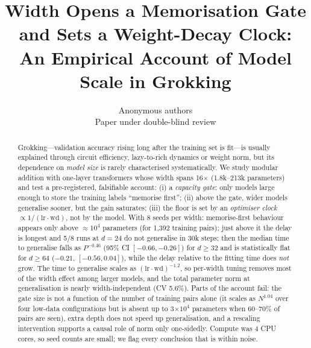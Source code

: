 \documentclass{article} %
\title{Width Opens a Memorisation Gate and Sets a Weight-Decay Clock:\\ An Empirical Account of Model Scale in Grokking}
\author{Anonymous authors\\ Paper under double-blind review}
\begin{document}
\maketitle

\begin{abstract}
Grokking---validation accuracy rising long after the training set is fit---is usually explained through circuit efficiency, lazy-to-rich dynamics or weight norm, but its dependence on \emph{model size} is rarely characterised systematically. We study modular addition with one-layer transformers whose width spans 16$\times$ (1.8k--213k parameters) and test a pre-registered, falsifiable account: (i) a \emph{capacity gate}: only models large enough to store the training labels ``memorise first''; (ii) above the gate, wider models generalise sooner, but the gain saturates; (iii) the floor is set by an \emph{optimiser clock} $\propto1/(\mathrm{lr}\cdot\mathrm{wd})$, not by the model. With 8 seeds per width: memorise-first behaviour appears only above $\approx10^4$ parameters (for 1{,}392 training pairs); just above it the delay is longest and 5/8 runs at $d{=}24$ do not generalise in 30k steps; then the median time to generalise falls as $P^{-0.46}$ (95\% CI $[-0.66,-0.26]$) for $d\ge32$ and is statistically flat for $d\ge64$ ($-0.21$, $[-0.56,0.04]$), while the delay relative to the fitting time does \emph{not} grow. The time to generalise scales as $(\mathrm{lr}\cdot\mathrm{wd})^{-1.2}$, so per-width tuning removes most of the width effect among larger models, and the total parameter norm at generalisation is nearly width-independent (CV 5.6\%). Parts of the account fail: the gate size is not a function of the number of training pairs alone (it scales as $N^{1.04}$ over four low-data configurations but is absent up to 3$\times10^4$ parameters when 60--70\% of pairs are seen), extra depth does not speed up generalisation, and a rescaling intervention supports a causal role of norm only one-sidedly. Compute was 4 CPU cores, so seed counts are small; we flag every conclusion that is within noise.
\end{abstract}
\end{document}
